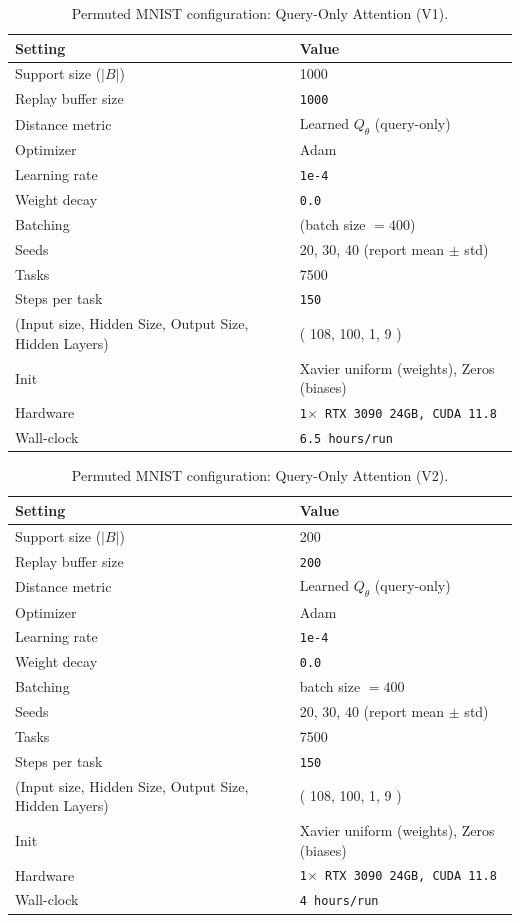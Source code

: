 \documentclass{article}
\begin{document}
 
\begin{table}[H]
\centering
\footnotesize
\caption{Permuted MNIST configuration: Query-Only Attention (V1).}
\label{tab:pmnist_query_only_attention_v1}
\begin{tabular}{@{}ll@{}}
\toprule
Setting & Value \\ \midrule
Support size ($|B|$) & 1000 \\
Replay buffer size & \texttt{1000} \\
Distance metric & Learned $Q_{\theta}$ (query-only) \\
Optimizer & Adam \\
Learning rate & \texttt{1e-4} \\
Weight decay & \texttt{0.0} \\
Batching & (batch size $=400$) \\
Seeds & 20, 30, 40 (report mean $\pm$ std) \\
Tasks & 7500 \\
Steps per task & \texttt{150} \\
(Input size, Hidden Size, Output Size, Hidden Layers) & ( 108, 100, 1, 9 ) \\ 
Init & Xavier uniform (weights), Zeros (biases) \\
Hardware & \texttt{1$\times$ RTX 3090 24GB, CUDA 11.8} \\
Wall-clock & \texttt{6.5 hours/run} \\
\bottomrule
\end{tabular}
\end{table}


\begin{table}[H]
\centering
\footnotesize
\caption{Permuted MNIST configuration: Query-Only Attention (V2).}
\label{tab:pmnist_query_only_attention_v2}
\begin{tabular}{@{}ll@{}}
\toprule
Setting & Value \\ \midrule
Support size ($|B|$) & 200 \\
Replay buffer size & \texttt{200} \\
Distance metric & Learned $Q_{\theta}$ (query-only) \\
Optimizer & Adam \\
Learning rate & \texttt{1e-4} \\
Weight decay & \texttt{0.0} \\
Batching & batch size $=400$ \\
Seeds & 20, 30, 40 (report mean $\pm$ std) \\
Tasks & 7500 \\
Steps per task & \texttt{150} \\
(Input size, Hidden Size, Output Size, Hidden Layers) & ( 108, 100, 1, 9 ) \\ 
Init & Xavier uniform (weights), Zeros (biases) \\
Hardware & \texttt{1$\times$ RTX 3090 24GB, CUDA 11.8} \\
Wall-clock & \texttt{4 hours/run} \\
\bottomrule
\end{tabular}
\end{table}
\end{document}

